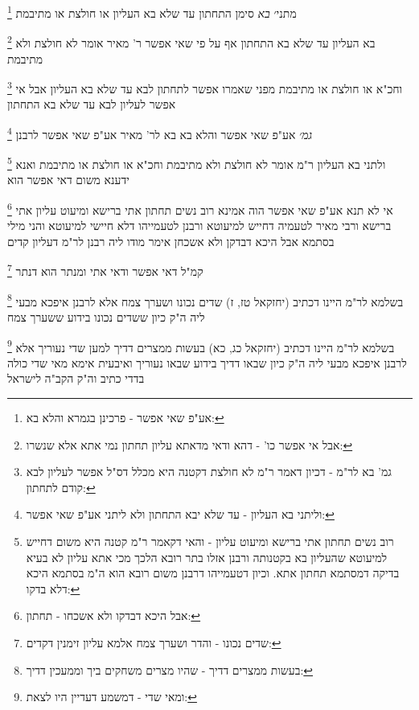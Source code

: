 \documentclass[12pt, openany]{book}
\newcommand{\footnotecomment}[1]{
	\renewcommand\thefootnote{}
	\footnote{#1}}
\newcommand{\commenta}[1]{\footnotecomment{#1}}
\begin{document}
{\commenta{אע"פ שאי אפשר - פרכינן בגמרא והלא בא:}
מתני׳ {\large\emph{בא}} סימן התחתון עד שלא בא העליון או חולצת או מתיבמת
\commenta{אבל אי אפשר כו' - דהא ודאי מדאתא עליון תחתון נמי אתא אלא שנשרו:}
בא העליון עד שלא בא התחתון אף על פי שאי אפשר ר' מאיר אומר לא חולצת ולא מתיבמת
\commenta{גמ' בא לר"מ - דכיון דאמר ר"מ לא חולצת דקטנה היא מכלל דס"ל אפשר לעליון לבא קודם לתחתון:}
וחכ"א או חולצת או מתיבמת מפני שאמרו אפשר לתחתון לבא עד שלא בא העליון אבל אי אפשר לעליון לבא עד שלא בא התחתון
\commenta{וליתני בא העליון - עד שלא יבא התחתון ולא ליתני אע"פ שאי אפשר:}
{\large\emph{גמ׳}} אע"פ שאי אפשר והלא בא בא לר' מאיר אע"פ שאי אפשר לרבנן 
\commenta{רוב נשים תחתון אתי ברישא ומיעוט עליון - והאי דקאמר ר"מ קטנה היא משום דחייש למיעוטא שהעליון בא בקטנותה ורבנן אזלו בתר רובא הלכך מכי אתא עליון לא בעיא בדיקה דמסתמא תחתון אתא. וכיון דטעמייהו דרבנן משום רובא הוא ה"מ בסתמא היכא דלא בדקו:}
ולתני בא העליון ר"מ אומר לא חולצת ולא מתיבמת וחכ"א או חולצת או מתיבמת ואנא ידענא משום דאי אפשר הוא 
\commenta{אבל היכא דבדקו ולא אשכחו - תחתון:}
אי לא תנא אע"פ שאי אפשר הוה אמינא רוב נשים תחתון אתי ברישא ומיעוט עליון אתי ברישא ורבי מאיר לטעמיה דחייש למיעוטא ורבנן לטעמייהו דלא חיישי למיעוטא 
והני מילי בסתמא אבל היכא דבדקן ולא אשכחן אימר מודו ליה רבנן לר"מ דעליון קדים
\commenta{שדים נכונו - והדר ושערך צמח אלמא עליון זימנין דקדים:}
קמ"ל דאי אפשר ודאי אתי ומנתר הוא דנתר 
\commenta{בעשות ממצרים דדיך - שהיו מצרים משחקים ביך וממעכין דדיך:}
בשלמא לר"מ היינו דכתיב (יחזקאל טז, ז) שדים נכונו ושערך צמח אלא לרבנן איפכא מבעי ליה ה"ק כיון ששדים נכונו בידוע ששערך צמח 
\commenta{ומאי שדי - דמשמע דעדיין היו לצאת:}
בשלמא לר"מ היינו דכתיב (יחזקאל כג, כא) בעשות ממצרים דדיך למען שדי נעוריך אלא לרבנן איפכא מבעי ליה 
ה"ק כיון שבאו דדיך בידוע שבאו נעוריך ואיבעית אימא מאי שדי כולה בדדי כתיב וה"ק הקב"ה לישראל}
\end{document}
